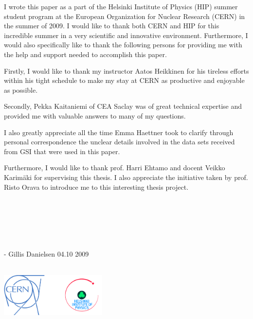 
I wrote this paper as a part of the Helsinki Institute of Physics (HIP) summer student program at the European Organization for Nuclear Research (CERN) in the summer of 2009. I would like to thank both CERN and HIP for this incredible summer in a very scientific and innovative environment. Furthermore, I would also specifically like to thank the following persons for providing me with the help and support needed to accomplish this paper.

Firstly, I would like to thank my instructor Aatos Heikkinen for his tireless efforts within his tight schedule to make my stay at CERN as productive and enjoyable as possible.

Secondly, Pekka Kaitaniemi of CEA Saclay was of great technical expertise and provided me with valuable answers to many of my questions.

I also greatly appreciate all the time Emma Haettner took to clarify through personal correspondence the unclear details involved in the data sets received from GSI that were used in this paper.

Furthermore, I would like to thank prof. Harri Ehtamo and docent Veikko Karimäki for supervising this thesis. I also appreciate the initiative taken by prof. Risto Orava to introduce me to this interesting thesis project.
\\
\\
\\
\\
\\
\\
\\
- Gillis Danielsen 04.10 2009
\\
\\
\begin{center}
 \includegraphics[width=0.4\textwidth]{images/logos.png}
\end{center}

\newpage



\tableofcontents


